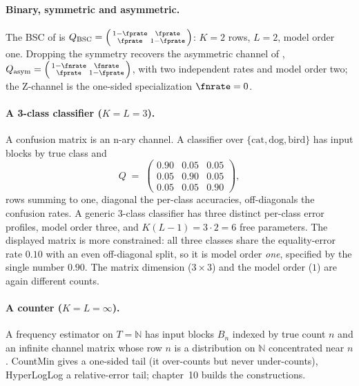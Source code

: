\paragraph{Binary, symmetric and asymmetric.}
The BSC of  is $Q_{\mathrm{BSC}} = \left(\begin{smallmatrix} 1 -
\fprate & \fprate \\ \fprate & 1 - \fprate \end{smallmatrix}\right)$: $K = 2$
rows, $L = 2$, model order one. Dropping the symmetry recovers the asymmetric
channel of , $Q_{\mathrm{asym}} =
\left(\begin{smallmatrix} 1 - \fnrate & \fnrate \\ \fprate & 1 - \fprate
\end{smallmatrix}\right)$, with two independent rates and model order two; the
Z-channel is the one-sided specialization $\fnrate = 0$.

\paragraph{A 3-class classifier ($K = L = 3$).}
A confusion matrix is an n-ary channel. A classifier over
$\{\text{cat}, \text{dog}, \text{bird}\}$ has input blocks by true class and
\[
  Q \;=\;
  \begin{pmatrix}
    0.90 & 0.05 & 0.05 \\
    0.05 & 0.90 & 0.05 \\
    0.05 & 0.05 & 0.90
  \end{pmatrix},
\]
rows summing to one, diagonal the per-class accuracies, off-diagonals the
confusion rates. A generic 3-class classifier has three distinct per-class
error profiles, model order three, and $K(L - 1) = 3 \cdot 2 = 6$ free
parameters. The displayed matrix is more constrained: all three classes share
the equality-error rate $0.10$ with an even off-diagonal split, so it is model
order \emph{one}, specified by the single number $0.90$. The matrix dimension
($3 \times 3$) and the model order ($1$) are again different counts.

\paragraph{A counter ($K = L = \infty$).}
A frequency estimator on $T = \mathbb{N}$ has input blocks $B_n$ indexed by true
count $n$ and an infinite channel matrix whose row $n$ is a distribution on
$\mathbb{N}$ concentrated near $n$. CountMin gives a one-sided tail (it
over-counts but never under-counts), HyperLogLog a relative-error tail;
chapter~10 builds the constructions.

